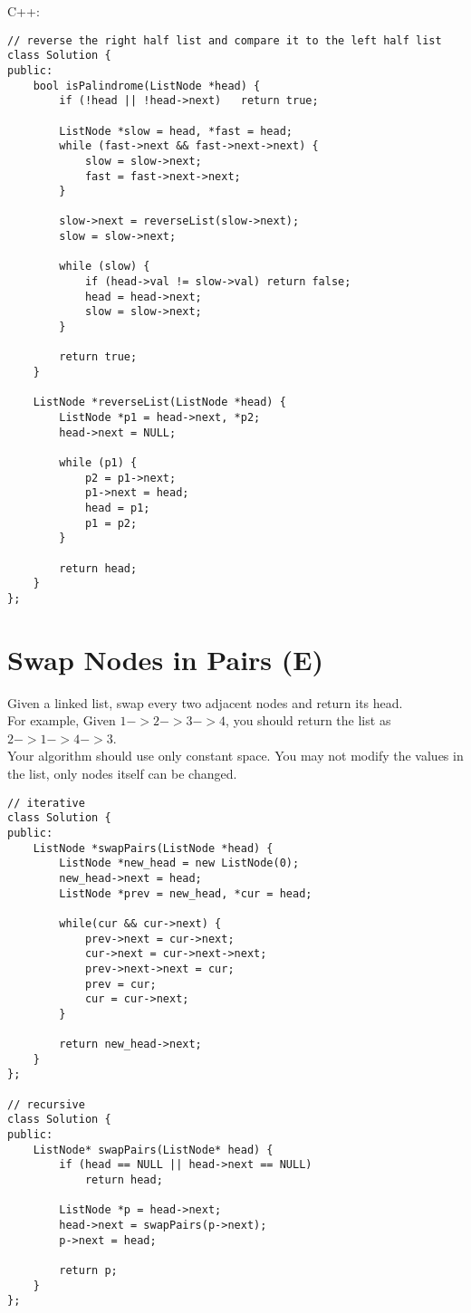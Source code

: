 C++:
\lstset{language=C++}
\begin{lstlisting}
// reverse the right half list and compare it to the left half list
class Solution {
public:
    bool isPalindrome(ListNode *head) {
        if (!head || !head->next)   return true;
        
        ListNode *slow = head, *fast = head;
        while (fast->next && fast->next->next) {
            slow = slow->next;
            fast = fast->next->next;
        }
        
        slow->next = reverseList(slow->next);
        slow = slow->next;
        
        while (slow) {
            if (head->val != slow->val) return false;
            head = head->next;
            slow = slow->next;
        }
        
        return true;
    }
    
    ListNode *reverseList(ListNode *head) {
        ListNode *p1 = head->next, *p2;
        head->next = NULL;
        
        while (p1) {
            p2 = p1->next;
            p1->next = head;
            head = p1;
            p1 = p2;
        }
        
        return head;
    }
};
\end{lstlisting} 


\section{Swap Nodes in Pairs (E)}
Given a linked list, swap every two adjacent nodes and return its head. \\

For example, Given $1->2->3->4$, you should return the list as $2->1->4->3$. \\

Your algorithm should use only constant space. You may not modify the values in the list, only nodes itself can be changed. \\

\begin{lstlisting}
// iterative
class Solution {
public:
    ListNode *swapPairs(ListNode *head) {
        ListNode *new_head = new ListNode(0);
        new_head->next = head;
        ListNode *prev = new_head, *cur = head;
        
        while(cur && cur->next) {
            prev->next = cur->next;
            cur->next = cur->next->next;
            prev->next->next = cur;
            prev = cur;
            cur = cur->next;
        }
        
        return new_head->next;
    }
};

// recursive
class Solution {
public:
    ListNode* swapPairs(ListNode* head) {
        if (head == NULL || head->next == NULL)
            return head;
        
        ListNode *p = head->next;
        head->next = swapPairs(p->next);
        p->next = head;
        
        return p;
    }
};
\end{lstlisting}


